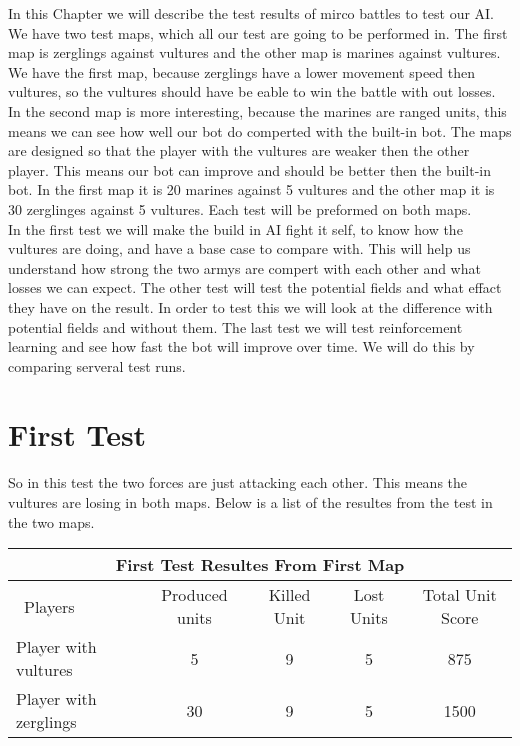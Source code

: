 In this Chapter we will describe the test results of mirco battles to test our AI. We have two test maps, which all our test are going to be performed in.
The first map is  zerglings against vultures and the other map is marines against vultures. We have the first map, because zerglings have a lower movement
speed then vultures, so the vultures should have be eable to win the battle with out losses. In the second map is more interesting, because the marines
are ranged units, this means we can see how well our bot do comperted with the built-in bot. The maps are  designed so that the player with the vultures
are weaker then the other player. This means our bot can improve and should be better then the built-in bot. In the first map it is 20 marines against 5
vultures and the other map it is 30 zerglinges against 5 vultures. Each test will be preformed on both maps. \\

 In the first test we will make the build in AI fight it self, to know how the vultures are doing, and have a base case to compare with. This will help us understand how strong the
two armys are compert with each other and what losses we can expect. The other test will test the potential fields and what effact they have on the result.
In order to test this we will look at the difference with potential fields and without them. The last test we will test reinforcement learning and see how
fast the bot will improve over time. We will do this by comparing serveral test runs.

\section{First Test}
So in this test the two forces are just attacking each other. This means the vultures are losing in both maps. Below is a list of the resultes from the test
in the two maps.

\begin{centering}
 \begin{tabular}{|l||c|c|c|c|}
	\multicolumn{5}{c}{First Test Resultes From First Map} \\
	\hline
	\ Players & Produced units & Killed Unit & Lost Units &  Total Unit Score \\
	\hline
	\hline
		Player with vultures & 5 & 9 & 5  & 875\\
	\hline
		Player with zerglings & 30 & 9 & 5 & 1500\\
	\hline

\end{tabular}
\end{centering}

